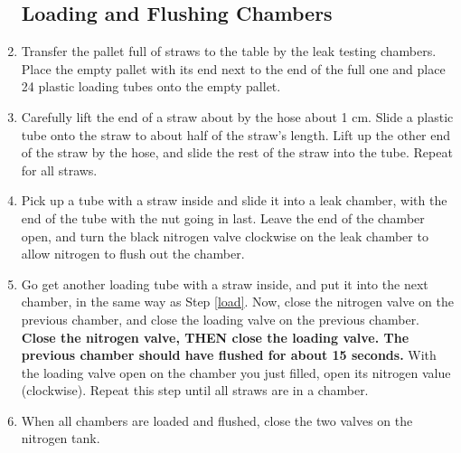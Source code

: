 \documentclass[A4,12pt]{article}
\begin{document}
\begin{enumerate}
\subsection{Loading and Flushing Chambers}	
		\item Transfer the pallet full of straws to the table by the leak testing chambers. Place the empty pallet with its end next to the end of the full one and place 24 plastic loading tubes onto the empty pallet.		
		\item Carefully lift the end of a straw about by the hose about 1 cm. Slide a plastic tube onto the straw to about half of the straw's length. Lift up the other end of the straw by the hose, and slide the rest of the straw into the tube. Repeat for all straws.
		 \item Pick up a tube with a straw inside and slide it into a leak chamber, with the end of the tube with the nut going in last. Leave the end of the chamber open, and turn the black nitrogen valve clockwise on the leak chamber to allow nitrogen to flush out the chamber. \label{load}
		 \item Go get another loading tube with a straw inside, and put it into the next chamber, in the same way as Step \ref{load}. Now, close the nitrogen valve on the previous chamber, and close the loading valve on the previous chamber. {\bf Close the nitrogen valve, THEN close the loading valve. The previous chamber should have flushed for about 15 seconds.} With the loading valve open on the chamber you just filled, open its nitrogen value (clockwise). Repeat this step until all straws are in a chamber.
		 \item When all chambers are loaded and flushed, close the two valves on the nitrogen tank.
        
\end{enumerate}
\end{document}
